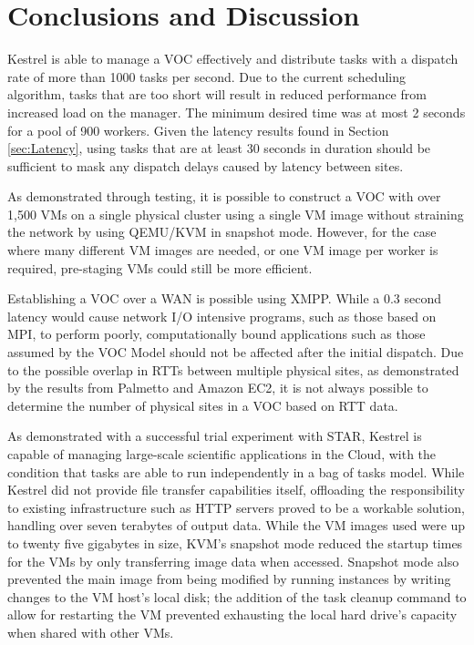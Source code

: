 \chapter{Conclusions and Discussion}
\label{chap:Conclusions}

Kestrel is able to manage a VOC effectively and distribute tasks with a
dispatch rate of more than 1000 tasks per second. Due to the current scheduling
algorithm, tasks that are too short will result in reduced performance
from increased load on the manager. The minimum desired time was at most 2
seconds for a pool of 900 workers. Given the latency results found in Section
\ref{sec:Latency}, using tasks that are at least 30 seconds in duration should
be sufficient to mask any dispatch delays caused by latency between sites.

As demonstrated through testing, it is possible to construct a VOC with over
1,500 VMs on a single physical cluster using a single VM image without straining
the network by using QEMU/KVM in snapshot mode. However, for the case where
many different VM images are needed, or one VM image per worker is required,
pre-staging VMs could still be more efficient.

Establishing a VOC over a WAN is possible using XMPP. While a 0.3 second latency
would cause network I/O intensive programs, such as those based on MPI, to
perform poorly, computationally bound applications such as those assumed by the
VOC Model should not be affected after the initial dispatch. Due to the possible
overlap in RTTs between multiple physical sites, as demonstrated by the results
from Palmetto and Amazon EC2, it is not always possible to determine the number
of physical sites in a VOC based on RTT data.

As demonstrated with a successful trial experiment with STAR, Kestrel is
capable of managing large-scale scientific applications in the Cloud, with the
condition that tasks are able to run independently in a bag of tasks model.
While Kestrel did not provide file transfer capabilities itself, offloading
the responsibility to existing infrastructure such as HTTP servers proved to
be a workable solution, handling over seven terabytes of output data. While
the VM images used were up to twenty five gigabytes in size, KVM's snapshot
mode reduced the startup times for the VMs by only transferring image data when
accessed. Snapshot mode also prevented the main image from being modified by
running instances by writing changes to the VM host's local disk; the addition
of the task cleanup command to allow for restarting the VM prevented exhausting
the local hard drive's capacity when shared with other VMs.

